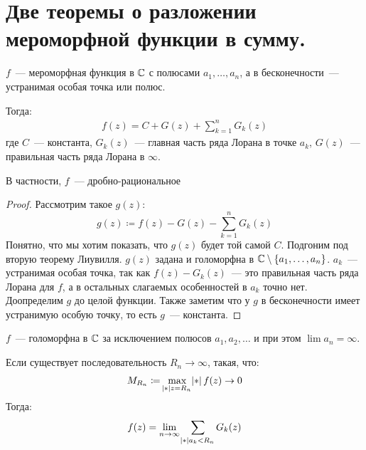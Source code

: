 \section{Две теоремы о разложении мероморфной функции в сумму.}

\begin{theorem}
    $f$~--- мероморфная функция в $\mathbb{C}$ с полюсами
    $a_1, \ldots, a_n$, а в бесконечности~--- устранимая
    особая точка или полюс.

    Тогда: 
    \begin{gather*}
        f(z) = C + G(z) + \sum\limits_{k=1}^n G_k(z)    
    \end{gather*}
    где $C$~--- константа, $G_k(z)$~--- главная
    часть ряда Лорана в точке $a_k$, $G(z)$~--- правильная
    часть ряда Лорана в $\infty$.

    В частности, $f$~--- дробно-рациональное
\end{theorem}

\begin{proof}
    Рассмотрим такое $g(z)$:
    $$g(z) \coloneqq f(z) - G(z) - \sum\limits_{k=1}^n G_k(z)$$
    Понятно, что мы хотим показать, что $g(z)$ будет той самой $C$. Подгоним под вторую теорему Лиувилля. 
    $g(z)$ задана и голоморфна в
    $\mathbb{C} \setminus \left\{a_1, \ldots, a_n\right\}$.
    $a_k$~--- устранимая особая точка,
    так как $f(z) - G_k(z)$~--- это правильная часть ряда Лорана для
    $f$, а в остальных слагаемых особенностей в $a_k$ точно нет.
    Доопределим $g$ до целой функции.
    Также заметим что у $g$ в бесконечности
    имеет устранимую особую точку, то есть $g$~--- константа.
\end{proof}

\begin{theorem}
    $f$~--- голоморфна в $\mathbb{C}$ за исключением полюсов
    $a_1, a_2, \ldots$ и при этом $\lim a_n = \infty$.

    Если существует последовательность $R_n \to \infty$, такая, что: 
    \begin{gather*}
        M_{R_n} \coloneqq \max_{\abs{z} = R_n} \abs{f(z)} \to 0
    \end{gather*}
    Тогда: 
    \begin{gather*}
        f(z) = \lim_{n\to\infty} \sum\limits_{\abs{a_k} < R_n} G_k(z)
    \end{gather*}
\end{theorem}

